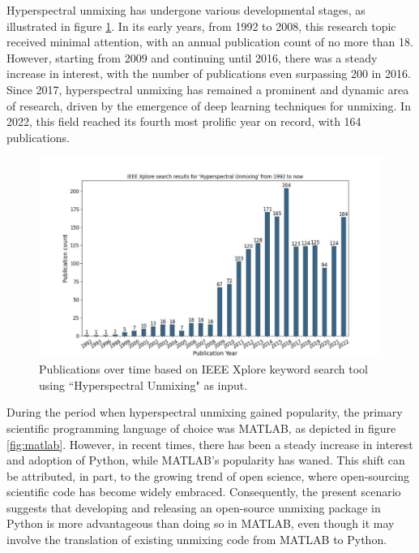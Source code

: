 Hyperspectral unmixing has undergone various developmental stages, as illustrated in figure \ref{fig:publications}. 
In its early years, from 1992 to 2008, this research topic received minimal attention, with an annual publication count of no more than 18. 
However, starting from 2009 and continuing until 2016, there was a steady increase in interest, with the number of publications even surpassing 200 in 2016. 
Since 2017, hyperspectral unmixing has remained a prominent and dynamic area of research, driven by the emergence of deep learning techniques for unmixing. 
In 2022, this field reached its fourth most prolific year on record, with 164 publications.

\begin{figure}[h]
    \centering
    \includegraphics[width=\linewidth]{fichiers_latex/Chap4/figs/HU_results_IEEE-bigger.pdf}
    \caption{Publications over time based on IEEE Xplore keyword search tool using ``Hyperspectral Unmixing" as input.}
    \label{fig:publications}
\end{figure}


During the period when hyperspectral unmixing gained popularity, the primary scientific programming language of choice was MATLAB, as depicted in figure \ref{fig:matlab}. 
However, in recent times, there has been a steady increase in interest and adoption of Python, while MATLAB's popularity has waned. 
This shift can be attributed, in part, to the growing trend of open science, where open-sourcing scientific code has become widely embraced. 
Consequently, the present scenario suggests that developing and releasing an open-source unmixing package in Python is more advantageous than doing so in MATLAB, even though it may involve the translation of existing unmixing code from MATLAB to Python.

